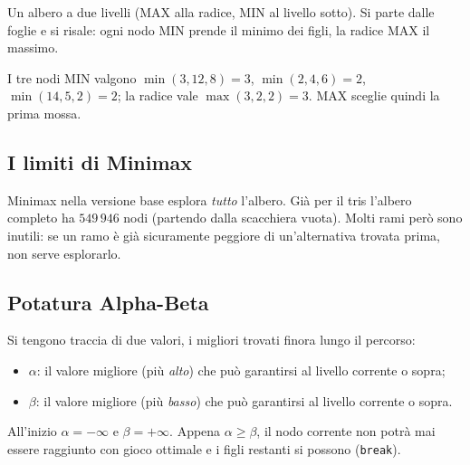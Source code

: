\begin{extra}
Un albero a due livelli (MAX alla radice, MIN al livello sotto). Si parte dalle foglie e si
risale: ogni nodo MIN prende il minimo dei figli, la radice MAX il massimo.

\begin{center}
\end{center}
I tre nodi MIN valgono $\min(3,12,8) = 3$, $\min(2,4,6) = 2$, $\min(14,5,2) = 2$;
la radice vale $\max(3,2,2) = 3$. MAX sceglie quindi la prima mossa.
\end{extra}

\subsection{I limiti di Minimax}

Minimax nella versione base esplora \emph{tutto} l'albero. Già per il tris l'albero completo
ha $549\,946$ nodi (partendo dalla scacchiera vuota). Molti rami però sono inutili:
se un ramo è già sicuramente peggiore di un'alternativa trovata prima, non serve esplorarlo.

\subsection{Potatura Alpha-Beta}

Si tengono traccia di due valori, i migliori trovati finora lungo il percorso:
\begin{itemize}
  \item $\alpha$: il valore migliore (più \emph{alto}) che  può garantirsi
        al livello corrente o sopra;
  \item $\beta$: il valore migliore (più \emph{basso}) che  può garantirsi
        al livello corrente o sopra.
\end{itemize}
All'inizio $\alpha = -\infty$ e $\beta = +\infty$. Appena $\alpha \geq \beta$, il nodo corrente
non potrà mai essere raggiunto con gioco ottimale e i figli restanti si possono 
(\texttt{break}).

